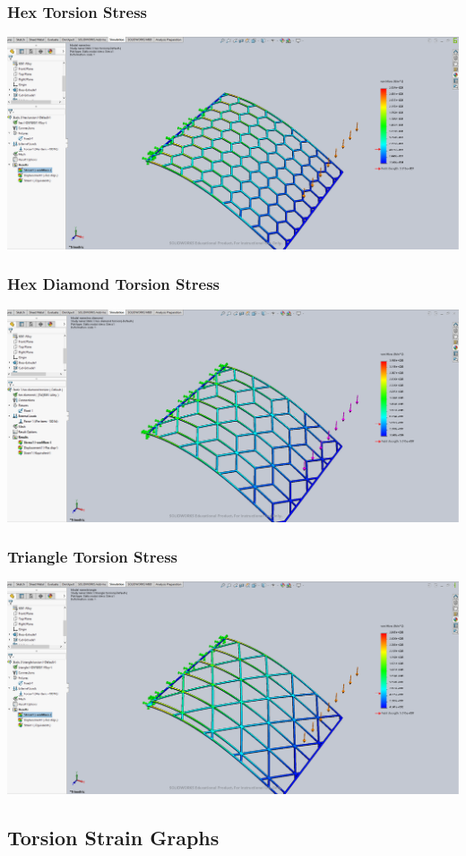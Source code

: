 \documentclass[12pt, letterpaper]{article}
\begin{document}
\begin{singlespace}
\subsubsection{Hex Torsion Stress}
\label{ap:h-to-vm}
\includegraphics[width=0.8\linewidth]{./graphs/torsion/hex-torsion-stress}

\subsubsection{Hex Diamond Torsion Stress}
\label{ap:hd-to-vm}
\includegraphics[width=0.8\linewidth]{./graphs/torsion/hex-diamond-torsion-stress}

\subsubsection{Triangle Torsion Stress}
\label{ap:t-to-vm}
\includegraphics[width=0.8\linewidth]{./graphs/torsion/triangle-torsion-stress}


\subsection{Torsion Strain Graphs}
\label{ap:to-es}


\end{singlespace}
\end{document}
